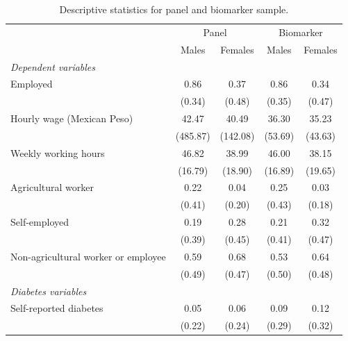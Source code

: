 \begin{table}
\caption{\label{tab:Pooled-sample-characteristics}Descriptive statistics for panel and biomarker sample.}
\begin{adjustbox}{max width=0.9\textwidth, center}
\begin{threeparttable}  %
{
\def\sym#1{\ifmmode^{#1}\else\(^{#1}\)\fi}
\begin{tabular}{l*{4}{c}}
\toprule
                    &\multicolumn{2}{c}{Panel}&\multicolumn{2}{c}{Biomarker}\\\cmidrule(lr){2-3}\cmidrule(lr){4-5}
                    &\multicolumn{1}{c}{Males}&\multicolumn{1}{c}{Females}&\multicolumn{1}{c}{Males}&\multicolumn{1}{c}{Females}\\
                    \midrule
\hspace*{10mm}\emph{Dependent variables} \\
Employed           &        0.86&        0.37&        0.86&        0.34\\
                    &      (0.34)&      (0.48)&      (0.35)&      (0.47)\\
Hourly wage (Mexican Peso)        &      42.47&       40.49&       36.30&       35.23\\
                    &    (485.87)&    (142.08)&     (53.69)&     (43.63)\\
Weekly working hours&      46.82&       38.99&       46.00&       38.15\\
                    &     (16.79)&     (18.90)&     (16.89)&     (19.65)\\
Agricultural worker &        0.22&        0.04&        0.25&        0.03\\
                    &      (0.41)&      (0.20)&      (0.43)&      (0.18)\\
Self-employed       &        0.19&        0.28&        0.21&        0.32\\
                    &      (0.39)&      (0.45)&      (0.41)&      (0.47)\\
Non-agricultural worker or employee& 0.59&        0.68&        0.53&        0.64\\
                    &      (0.49)&      (0.47)&      (0.50)&      (0.48)\\
\hspace*{10mm}\emph{Diabetes variables} \\
Self-reported diabetes  &         0.05&        0.06&        0.09&        0.12\\
                    &      (0.22)&      (0.24)&      (0.29)&      (0.32)\\

\end{tabular}}
\end{threeparttable}
\end{adjustbox}
\end{table}
